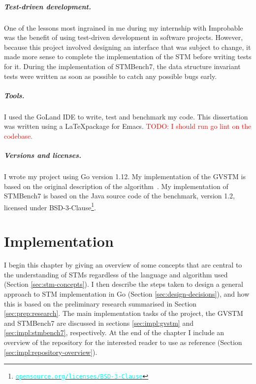 \documentclass[12pt,a4paper,oneside,openright]{report}
\newcommand{\URL}[1]{\href{https://#1}{\textcolor{cyan}{\texttt{#1}}}}
\newcommand{\todo}[1]{\textcolor{red}{TODO: #1}}
\begin{document}
\paragraph{Test-driven development.} One of the lessons most ingrained
in me during my internship with Improbable was the benefit of using
test-driven development in software projects. However, because this
project involved designing an interface that was subject to change, it
made more sense to complete the implementation of the STM before
writing tests for it. During the implementation of STMBench7, the data
structure invariant tests were written as soon as possible to catch
any possible bugs early.

\paragraph{Tools.} I used the GoLand IDE to write, test and benchmark
my code. This dissertation was written using a \LaTeX package for
Emacs.  \todo{I should run go lint on the codebase.}

\paragraph{Versions and licenses.} I wrote my project using Go version
1.12. My implementation of the GVSTM is based on the original
description of the algorithm~\cite{cachopo2007phd}. My implementation
of STMBench7 is based on the Java source code of the benchmark,
version 1.2, licensed under
BSD-3-Clause\footnote{\URL{opensource.org/licenses/BSD-3-Clause}}.




\chapter{Implementation}

I begin this chapter by giving an overview of some concepts that are
central to the understanding of STMs regardless of the language and
algorithm used (Section \ref{sec:stm-concepts}). I then describe the
steps taken to design a general approach to STM implementation in Go
(Section \ref{sec:design-decisions}), and how this is based on the
preliminary research summarised in Section
\ref{sec:prep:research}. The main implementation tasks of the project,
the GVSTM and STMBench7 are discussed in sections \ref{sec:impl:gvstm}
and \ref{sec:impl:stmbench7}, respectively. At the end of the chapter
I include an overview of the repository for the interested reader to
use as reference (Section \ref{sec:impl:repository-overview}).
\end{document}
